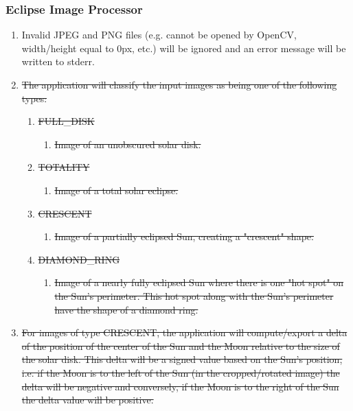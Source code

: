 \documentclass[10pt, onecolumn, draftclsnofoot, letterpaper, compsoc]{IEEEtran}
\begin{document}
\subsubsection{Eclipse Image Processor}
	\begin{enumerate}
		\item Invalid JPEG and PNG files (e.g. cannot be opened by OpenCV, 
		width/height equal to 0px, etc.) will be ignored and an error message 
		will be written to stderr.

		\item \sout{The application will classify the input images as being one of
			the following types:}
		\begin{enumerate}
			\item \sout{FULL\_DISK}
			\begin{enumerate}
				\item \sout{Image of an unobscured solar disk.}
			\end{enumerate}

			\item \sout{TOTALITY}
			\begin{enumerate}
				\item \sout{Image of a total solar eclipse.}
			\end{enumerate}

			\item \sout{CRESCENT}
			\begin{enumerate}
				\item \sout{Image of a partially eclipsed Sun, creating a "crescent" 
					shape.}
			\end{enumerate}

			\item \sout{DIAMOND\_RING}
			\begin{enumerate}
				\item \sout{Image of a nearly fully eclipsed Sun where there is one 
					"hot spot" on the Sun's perimeter. This hot spot along with the 
					Sun's perimeter have the shape of a diamond ring.}
			\end{enumerate}
		\end{enumerate}

		\item \sout{For images of type CRESCENT, the application will compute/export 
		a delta of the position of the center of the Sun and the 
		Moon relative to the size of the solar disk. This delta will be a 
		signed value based on the Sun's position, i.e. if the Moon is to 
		the left of the Sun (in the cropped/rotated image) the delta will 
		be negative and conversely, if the Moon is to the right of the Sun 
		the delta value will be positive.}


\end{enumerate}
\end{document}
